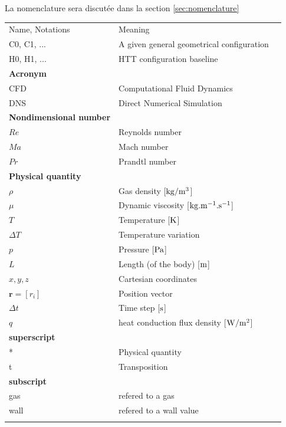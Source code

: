 
La nomenclature sera discutée dans la section \ref{sec:nomenclature}



\begin{center}
\begin{tabular}{p{} p{12cm}l}
 \Xhline{2pt}
  Name, Notations   &  Meaning  \\  \Xhline{1pt}
  C0, C1, ...       &  A given general geometrical configuration \\
  H0, H1, ...       &  HTT configuration baseline \\
  \hline
  \textbf{Acronym}  &                             \\
  CFD               & Computational Fluid Dynamics \\
  DNS               & Direct Numerical Simulation \\
  \hline
  \textbf{Nondimensional number} &  \\
  $Re$              & Reynolds number  \\
  $Ma$               & Mach number    \\
  $Pr$              & Prandtl number \\       
  \hline
  \textbf{Physical quantity} &    \\
  $\rho$           	& Gas density [$\rm kg/m^3$] \\
  $\mu$             & Dynamic viscosity [$\rm kg.m^{-1}.s^{-1}$]\\
  $T$               & Temperature [$\rm K$] \\
  $\Delta T$        & Temperature variation \\
  $p$               & Pressure [$\rm Pa$]\\
  $L$               & Length (of the body) [$\rm m$]  \\
  $x,y, z$          & Cartesian coordinates \\
  $\textbf{r}=[r_i]$      & Position vector\\
  $\Delta t$        & Time step [$\rm s$] \\
  $q$               & heat conduction flux density [$\rm W/m^2$] \\
   \Xhline{1pt} 
  \textbf{superscript}        &  \\
  *               & Physical quantity   \\
  t               & Transposition \\
  \hline
  \textbf{subscript}            &  \\
  gas                & refered to a gas \\
  wall               & refered to a wall value \\
 \Xhline{2pt}
\end{tabular}
 \end{center}


 